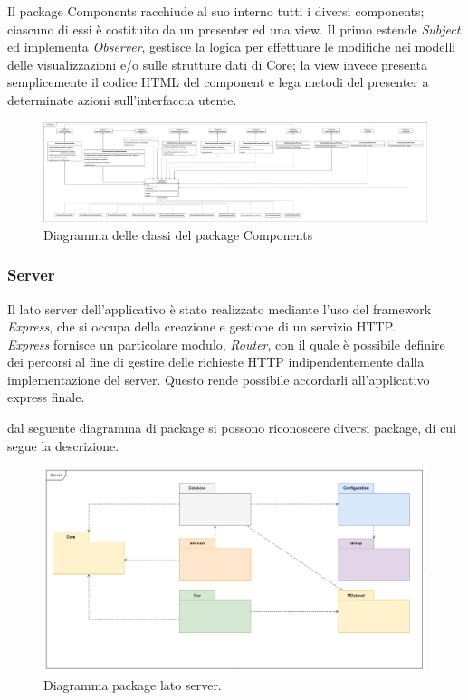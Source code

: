 \documentclass[../manuale_sviluppatore.tex]{subfiles}
\begin{document}
Il package Components racchiude al suo interno tutti i diversi components; ciascuno di essi è 
costituito da un presenter ed una view. Il primo estende \emph{Subject} ed implementa 
\emph{Observer}, gestisce la logica per effettuare le modifiche nei modelli delle visualizzazioni e/o 
sulle strutture dati di Core; la view invece presenta semplicemente il codice HTML del component e 
lega metodi del presenter a determinate azioni sull'interfaccia utente.

\begin{figure}[H]
	\centering
	\includegraphics[width=18cm]{src/img/components.pdf}
	\caption{Diagramma delle classi del package Components}
\end{figure}

\subsubsection{Server}
\label{ssub:server}

Il lato server dell'applicativo è stato realizzato mediante l'uso del framework \emph{Express}, che 
si occupa della creazione e gestione di un servizio HTTP. \\
\emph{Express} fornisce un particolare modulo, \emph{Router}, con il quale è possibile definire dei 
percorsi al fine di gestire delle richieste HTTP indipendentemente dalla implementazione del server. 
Questo rende possibile accordarli all'applicativo express finale.

\par dal seguente diagramma di package si possono riconoscere diversi package, di cui segue la 
descrizione.\\

\begin{figure}[H]
	\centering
	\includegraphics[width=18cm]{src/img/package-server.png}
	\caption{Diagramma package lato server.}
\end{figure}
\end{document}
